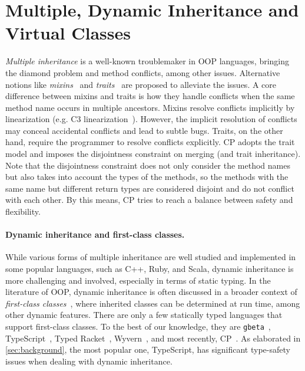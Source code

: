 \section{Multiple, Dynamic Inheritance and Virtual Classes}

\emph{Multiple inheritance} is a well-known troublemaker in OOP languages,
bringing the diamond problem and method conflicts, among other issues.
Alternative notions like \emph{mixins}~\citep{bracha1990mixin} and
\emph{traits}~\citep{ducasse2006traits} are proposed to alleviate the issues. A
core difference between mixins and traits is how they handle conflicts when the
same method name occurs in multiple ancestors. Mixins resolve conflicts
implicitly by linearization (e.g. C3
linearization~\citep{barrett1996monotonic}). However, the implicit resolution of
conflicts may conceal accidental conflicts and lead to subtle bugs. Traits, on
the other hand, require the programmer to resolve conflicts explicitly. CP
adopts the trait model and imposes the disjointness constraint on merging (and
trait inheritance). Note that the disjointness constraint does not only consider
the method names but also takes into account the types of the methods, so the
methods with the same name but different return types are considered disjoint
and do not conflict with each other. By this means, CP tries to reach a balance
between safety and flexibility.

\paragraph{Dynamic inheritance and first-class classes.} \label{sec:first-class}
While various forms of multiple inheritance are well studied and implemented in
some popular languages, such as C++, Ruby, and Scala, dynamic inheritance is
more challenging and involved, especially in terms of static typing. In the
literature of OOP, dynamic inheritance is often discussed in a broader context
of \emph{first-class classes}~\citep{strickland2013contracts}, where inherited
classes can be determined at run time, among other dynamic features. There are
only a few statically typed languages that support first-class classes. To the
best of our knowledge, they are \texttt{gbeta}~\citep{ernst2000gbeta},
TypeScript~\citep{typescript}, Typed Racket~\citep{takikawa2012gradual},
Wyvern~\citep{lee2015theory}, and most recently,
CP~\citep{zhang2021compositional}. As elaborated in \autoref{sec:background},
the most popular one, TypeScript, has significant type-safety issues when
dealing with dynamic inheritance.

